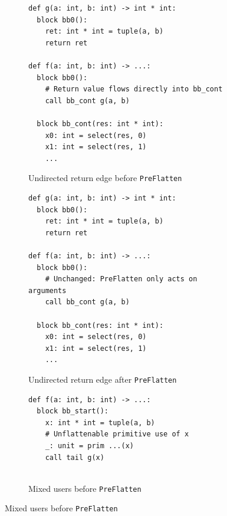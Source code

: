 
\begin{figure}[htbp]
  \centering
  \begin{subfigure}[t]{0.48\textwidth}
    \caption{Undirected return edge before \texttt{PreFlatten}}
    \label{fig:pre_flatten_undirected_before}
\begin{verbatim}
def g(a: int, b: int) -> int * int:
  block bb0():
    ret: int * int = tuple(a, b)
    return ret

def f(a: int, b: int) -> ...:
  block bb0():
    # Return value flows directly into bb_cont
    call bb_cont g(a, b)

  block bb_cont(res: int * int):
    x0: int = select(res, 0)
    x1: int = select(res, 1)
    ...
\end{verbatim}
  \end{subfigure}\hfill
  \begin{subfigure}[t]{0.48\textwidth}
    \caption{Undirected return edge after \texttt{PreFlatten}}
    \label{fig:pre_flatten_undirected_after}
\begin{verbatim}
def g(a: int, b: int) -> int * int:
  block bb0():
    ret: int * int = tuple(a, b)
    return ret

def f(a: int, b: int) -> ...:
  block bb0():
    # Unchanged: PreFlatten only acts on arguments
    call bb_cont g(a, b)

  block bb_cont(res: int * int):
    x0: int = select(res, 0)
    x1: int = select(res, 1)
    ...
\end{verbatim}
  \end{subfigure}

  \vspace{1mm}

  \begin{subfigure}[t]{0.48\textwidth}
    \caption{Mixed users before \texttt{PreFlatten}}
    \label{fig:pre_flatten_mixed_users_before}
\begin{verbatim}
def f(a: int, b: int) -> ...:
  block bb_start():
    x: int * int = tuple(a, b)
    # Unflattenable primitive use of x
    _: unit = prim ...(x)
    call tail g(x)


\end{verbatim}
\end{subfigure}
\end{figure}
